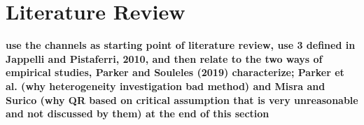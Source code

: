 \section{Literature Review} \label{sec:lit}
\textbf{use the channels as starting point of literature review, use 3 defined in Jappelli and Pistaferri, 2010, and then relate to the two ways of empirical studies, Parker and Souleles (2019) characterize; Parker et al. (why heterogeneity investigation bad method) and Misra and Surico (why QR based on critical assumption that is very unreasonable and not discussed by them) at the end of this section}